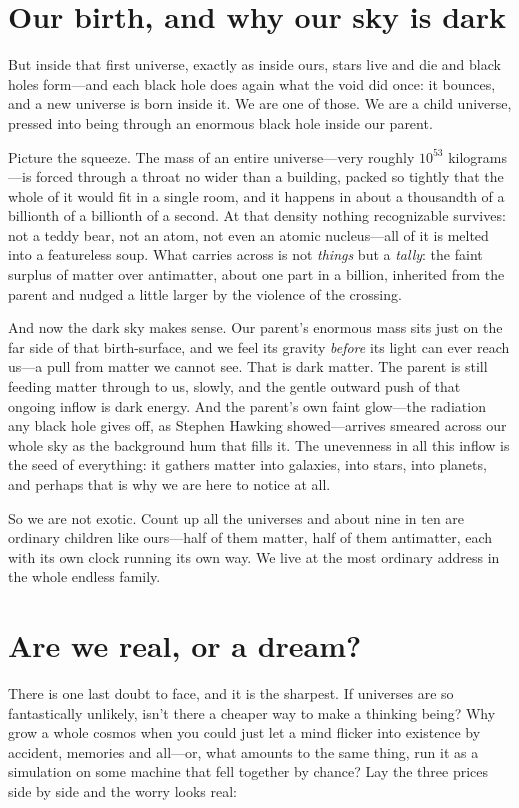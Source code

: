 \section*{Our birth, and why our sky is dark}

But inside that first universe, exactly as inside ours, stars live and die and
black holes form---and each black hole does again what the void did once: it
bounces, and a new universe is born inside it. We are one of those. We are a child
universe, pressed into being through an enormous black hole inside our parent.

Picture the squeeze. The mass of an entire universe---very roughly $10^{53}$
kilograms---is forced through a throat no wider than a building, packed so tightly
that the whole of it would fit in a single room, and it happens in about a
thousandth of a billionth of a billionth of a second. At that density nothing
recognizable survives: not a teddy bear, not an atom, not even an atomic
nucleus---all of it is melted into a featureless soup. What carries across is not
\emph{things} but a \emph{tally}: the faint surplus of matter over antimatter,
about one part in a billion, inherited from the parent and nudged a little larger
by the violence of the crossing.

And now the dark sky makes sense. Our parent's enormous mass sits just on the far
side of that birth-surface, and we feel its gravity \emph{before} its light can
ever reach us---a pull from matter we cannot see. That is dark matter. The parent
is still feeding matter through to us, slowly, and the gentle outward push of that
ongoing inflow is dark energy. And the parent's own faint glow---the radiation any
black hole gives off, as Stephen Hawking showed---arrives smeared across our whole
sky as the background hum that fills it. The unevenness in all this inflow is the
seed of everything: it gathers matter into galaxies, into stars, into planets, and
perhaps that is why we are here to notice at all.

So we are not exotic. Count up all the universes and about nine in ten are
ordinary children like ours---half of them matter, half of them antimatter, each
with its own clock running its own way. We live at the most ordinary address in
the whole endless family.

\section*{Are we real, or a dream?}

There is one last doubt to face, and it is the sharpest. If universes are so
fantastically unlikely, isn't there a cheaper way to make a thinking being? Why
grow a whole cosmos when you could just let a mind flicker into existence by
accident, memories and all---or, what amounts to the same thing, run it as a
simulation on some machine that fell together by chance? Lay the three prices side
by side and the worry looks real:


